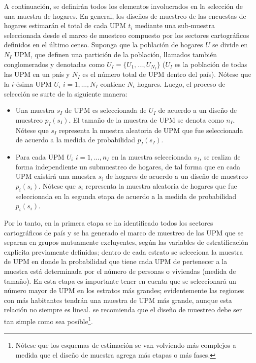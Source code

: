 \documentclass[
  12pt,
  spanish,
]{book}
\providecommand{\tightlist}{%
  \setlength{\itemsep}{0pt}\setlength{\parskip}{0pt}}
\begin{document}
A continuación, se definirán todos los elementos involucrados en la selección de una muestra de hogares. En general, los diseños de muestreo de las encuestas de hogares estimarán el total de cada UPM \(t_i\) mediante una sub-muestra seleccionada desde el marco de muestreo compuesto por los sectores cartográficos definidos en el último censo. Suponga que la población de hogares \(U\) se divide en \(N_I\) UPM, que definen una partición de la población, llamados también conglomerados y denotadas como \(U_I=\{U_1,\ldots,U_{N_I}\}\) (\(U_I\) es la población de todas las UPM en un país y \(N_I\) es el número total de UPM dentro del país). Nótese que la \(i\)-ésima UPM \(U_i\) \(i=1,\dots,N_I\) contiene \(N_i\) hogares. Luego, el proceso de selección se surte de la siguiente manera:

\begin{itemize}
\tightlist
\item
  Una muestra \(s_I\) de UPM es seleccionada de \(U_I\) de acuerdo a un diseño de muestreo \(p_I(s_I)\). El tamaño de la muestra de UPM se denota como \(n_I\). Nótese que \(s_I\) representa la muestra aleatoria de UPM que fue seleccionada de acuerdo a la medida de probabilidad \(p_I(s_I)\).
\item
  Para cada UPM \(U_i\) \(i=1,\dots,n_I\) en la muestra seleccionada \(s_I\), se realiza de forma independiente un submuestreo de hogares, de tal forma que en cada UPM existirá una muestra \(s_i\) de hogares de acuerdo a un diseño de muestreo \(p_i(s_i)\). Nótese que \(s_i\) representa la muestra aleatoria de hogares que fue seleccionada en la segunda etapa de acuerdo a la medida de probabilidad \(p_i(s_i)\).
\end{itemize}

Por lo tanto, en la primera etapa se ha identificado todos los sectores cartográficos de país y se ha generado el marco de muestreo de las UPM que se separan en grupos mutuamente excluyentes, según las variables de estratificación explícita previamente definidas; dentro de cada estrato se selecciona la muestra de UPM en donde la probabilidad que tiene cada UPM de pertenecer a la muestra está determinada por el número de personas o viviendas (medida de tamaño). En esta etapa es importante tener en cuenta que se seleccionará un número mayor de UPM en los estratos más grandes; evidentemente las regiones con más habitantes tendrán una muestra de UPM más grande, aunque esta relación no siempre es lineal. se recomienda que el diseño de muestreo debe ser tan simple como sea posible\footnote{Nótese que los esquemas de estimación se van volviendo más complejos a medida que el diseño de muestra agrega más etapas o más fases.}.
\end{document}
